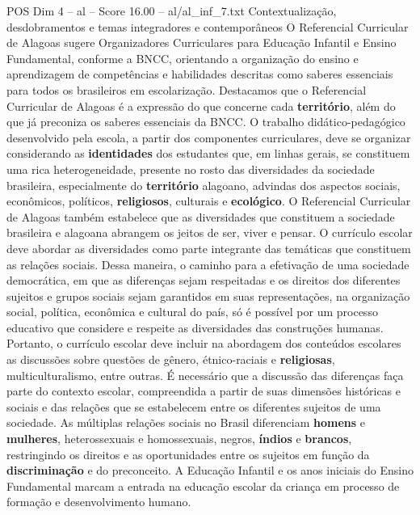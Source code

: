 \begin{textsample}{POS Dim 4 – al – Score 16.00 – al/al\_inf\_7.txt}  \label{ex:f4_pos_048}
Contextualização, desdobramentos e temas integradores e contemporâneos O Referencial Curricular de Alagoas sugere Organizadores Curriculares para Educação Infantil e Ensino Fundamental, conforme a BNCC, orientando a organização do ensino e aprendizagem de competências e habilidades descritas como saberes essenciais para todos os brasileiros em escolarização.
Destacamos que o Referencial Curricular de Alagoas é a expressão do que concerne cada \textbf{território}, além do que já preconiza os saberes essenciais da BNCC.
O trabalho didático-pedagógico desenvolvido pela escola, a partir dos componentes curriculares, deve se organizar considerando as \textbf{identidades} dos estudantes que, em linhas gerais, se constituem uma rica heterogeneidade, presente no rosto das diversidades da sociedade brasileira, especialmente do \textbf{território} alagoano, advindas dos aspectos sociais, econômicos, políticos, \textbf{religiosos}, culturais e \textbf{ecológico}.
O Referencial Curricular de Alagoas também estabelece que as diversidades que constituem a sociedade brasileira e alagoana abrangem os jeitos de ser, viver e pensar.
O currículo escolar deve abordar as diversidades como parte integrante das temáticas que constituem as relações sociais.
Dessa maneira, o caminho para a efetivação de uma sociedade democrática, em que as diferenças sejam respeitadas e os direitos dos diferentes sujeitos e grupos sociais sejam garantidos em suas representações, na organização social, política, econômica e cultural do país, só é possível por um processo educativo que considere e respeite as diversidades das construções humanas.
Portanto, o currículo escolar deve incluir na abordagem dos conteúdos escolares as discussões sobre questões de gênero, étnico-raciais e \textbf{religiosas}, multiculturalismo, entre outras.
É necessário que a discussão das diferenças faça parte do contexto escolar, compreendida a partir de suas dimensões históricas e sociais e das relações que se estabelecem entre os diferentes sujeitos de uma sociedade.
As múltiplas relações sociais no Brasil diferenciam \textbf{homens} e \textbf{mulheres}, heterossexuais e homossexuais, negros, \textbf{índios} e \textbf{brancos}, restringindo os direitos e as oportunidades entre os sujeitos em função da \textbf{discriminação} e do preconceito.
A Educação Infantil e os anos iniciais do Ensino Fundamental marcam a entrada na educação escolar da criança em processo de formação e desenvolvimento humano.

\end{textsample}
